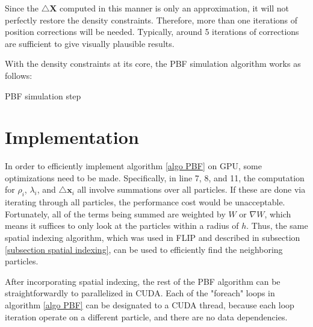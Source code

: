 Since the $\triangle \textbf{X}$ computed in this manner is only an approximation, it will not perfectly restore the density constraints. Therefore, more than one iterations of position corrections will be needed. Typically, around 5 iterations of corrections are sufficient to give visually plausible results. 

With the density constraints at its core, the PBF simulation algorithm works as follows:

\begin{algorithm}[H]
    \label{algo PBF}

    \SetAlgoLined

    \caption{PBF simulation step}
\end{algorithm}


\section{Implementation}
In order to efficiently implement algorithm \ref{algo PBF} on GPU, some optimizations need to be made. Specifically, in line 7, 8, and 11, the computation for $\rho_i$, $\lambda_i$, and $\triangle\textbf{x}_i$ all involve summations over all particles. If these are done via iterating through all particles, the performance cost would be unacceptable. Fortunately, all of the terms being summed are weighted by $W$ or $\nabla W$, which means it suffices to only look at the particles within a radius of $h$. Thus, the same spatial indexing algorithm, which was used in FLIP and described in subsection \ref{subsection spatial indexing}, can be used to efficiently find the neighboring particles. 

After incorporating spatial indexing, the rest of the PBF algorithm can be straightforwardly to parallelized in CUDA. Each of the "foreach" loops in algorithm \ref{algo PBF} can be designated to a CUDA thread, because each loop iteration operate on a different particle, and there are no data dependencies. 